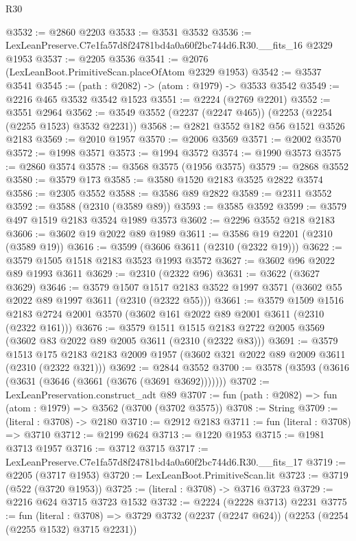 \begin{lexlean}{R30}
\begin{coremodule}
@3532 := @2860 @2203
@3533 := @3531 @3532
@3536 := LexLeanPreserve.C7e1fa57d8f24781bd4a0a60f2bc744d6.R30.__fits_16 @2329 @1953
@3537 := @2205 @3536
@3541 := @2076 (LexLeanBoot.PrimitiveScan.placeOfAtom @2329 @1953)
@3542 := @3537 @3541
@3545 := (path : @2082) -> (atom : @1979) -> @3533 @3542
@3549 := @2216 @465 @3532 @3542 @1523
@3551 := @2224 (@2769 @2201)
@3552 := @3551 @2964
@3562 := @3549 @3552 (@2237 (@2247 @465)) (@2253 (@2254 (@2255 @1523) @3532 @2231))
@3568 := @2821 @3552 @182 @56 @1521 @3526 @2183
@3569 := @2010 @1957
@3570 := @2006 @3569
@3571 := @2002 @3570
@3572 := @1998 @3571
@3573 := @1994 @3572
@3574 := @1990 @3573
@3575 := @2860 @3574
@3578 := @3568 @3575 (@1956 @3575)
@3579 := @2868 @3552
@3580 := @3579 @173
@3585 := @3580 @1520 @2183 @3525 @2822 @3574
@3586 := @2305 @3552
@3588 := @3586 @89 @2822
@3589 := @2311 @3552
@3592 := @3588 (@2310 (@3589 @89))
@3593 := @3585 @3592
@3599 := @3579 @497 @1519 @2183 @3524 @1989 @3573
@3602 := @2296 @3552 @218 @2183
@3606 := @3602 @19 @2022 @89 @1989
@3611 := @3586 @19 @2201 (@2310 (@3589 @19))
@3616 := @3599 (@3606 @3611 (@2310 (@2322 @19)))
@3622 := @3579 @1505 @1518 @2183 @3523 @1993 @3572
@3627 := @3602 @96 @2022 @89 @1993 @3611
@3629 := @2310 (@2322 @96)
@3631 := @3622 (@3627 @3629)
@3646 := @3579
    @1507
    @1517
    @2183
    @3522
    @1997
    @3571
    (@3602 @55 @2022 @89 @1997 @3611 (@2310 (@2322 @55)))
@3661 := @3579
    @1509
    @1516
    @2183
    @2724
    @2001
    @3570
    (@3602 @161 @2022 @89 @2001 @3611 (@2310 (@2322 @161)))
@3676 := @3579
    @1511
    @1515
    @2183
    @2722
    @2005
    @3569
    (@3602 @83 @2022 @89 @2005 @3611 (@2310 (@2322 @83)))
@3691 := @3579
    @1513
    @175
    @2183
    @2183
    @2009
    @1957
    (@3602 @321 @2022 @89 @2009 @3611 (@2310 (@2322 @321)))
@3692 := @2844 @3552
@3700 := @3578 (@3593 (@3616 (@3631 (@3646 (@3661 (@3676 (@3691 @3692)))))))
@3702 := LexLeanPreservation.construct_adt @89
@3707 := fun (path : @2082) => fun (atom : @1979) => @3562 (@3700 (@3702 @3575))
@3708 := String
@3709 := (literal : @3708) -> @2180
@3710 := @2912 @2183
@3711 := fun (literal : @3708) => @3710
@3712 := @2199 @624
@3713 := @1220 @1953
@3715 := @1981 @3713 @1957
@3716 := @3712 @3715
@3717 := LexLeanPreserve.C7e1fa57d8f24781bd4a0a60f2bc744d6.R30.__fits_17
@3719 := @2205 (@3717 @1953)
@3720 := LexLeanBoot.PrimitiveScan.lit
@3723 := @3719 (@522 (@3720 @1953))
@3725 := (literal : @3708) -> @3716 @3723
@3729 := @2216 @624 @3715 @3723 @1532
@3732 := @2224 (@2228 @3713) @2231
@3775 := fun (literal : @3708) =>
  @3729
    @3732
    (@2237 (@2247 @624))
    (@2253 (@2254 (@2255 @1532) @3715 @2231))

\end{coremodule}
\end{lexlean}

